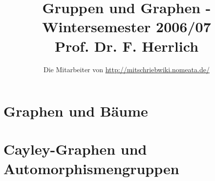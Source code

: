 \documentclass[a4paper, 10pt]{report}
\title{Gruppen und Graphen - Wintersemester 2006/07\\ Prof. Dr. F. Herrlich}
\author{Die Mitarbeiter von \url{http://mitschriebwiki.nomeata.de/}}
\begin{document}
\maketitle

\tableofcontents

\chapter{Graphen und Bäume}



\chapter{Cayley-Graphen und Automorphismengruppen}



\appendix
\renewcommand{\indexname}{Stichwortverzeichnis}
\printindex
\end{document}
